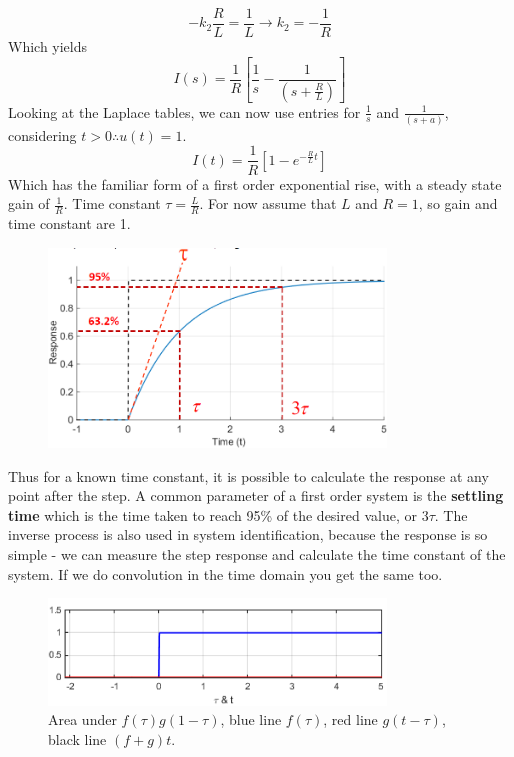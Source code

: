 \documentclass[class=report, crop=false, 12pt,a4paper, tikz, border=4mm]{standalone}
\begin{document}
\begin{equation}
  -k_2 \frac{R}{L} = \frac{1}{L} \rightarrow k_2 = -\frac{1}{R}
\end{equation}
Which yields
\begin{equation}
  I(s) = \frac{1}{R} \left[ \frac{1}{s} - \frac{1}{(s+\frac{R}{L})} \right]
\end{equation}
Looking at the Laplace tables, we can now use entries for $\frac{1}{s}$ and $\frac{1}{(s + a)}$, considering $t > 0 \therefore u(t) = 1$.
\begin{equation}
  I(t) = \frac{1}{R} \left[ 1 - e^{-\frac{R}{L}t}\right]
\end{equation}
Which has the familiar form of a first order exponential rise, with a steady state gain of $\frac{1}{R}$. Time constant $\tau = \frac{L}{R}$. For now assume that $L$ and $R = 1$, so gain and time constant are 1.
\begin{figure}[H]
  \centering
  \includegraphics[width = 0.8\textwidth]{../img/diagram31.png}
\end{figure}
Thus for a known time constant, it is possible to calculate the response at any point after the step. A common parameter of a first order system is the \textbf{settling time} which is the time taken to reach 95\% of the desired value, or $3\tau$. The inverse process is also used in system identification, because the response is so simple - we can measure the step response and calculate the time constant of the system. If we do convolution in the time domain you get the same too.
\begin{figure}[H]
  \centering
  \includegraphics[width = 0.8\textwidth]{../img/diagram32.png}
  \caption{Area under $f(\tau)g(1-\tau)$, blue line $f(\tau)$, red line $g(t-\tau)$, black line $(f+g)t$.}
\end{figure}
\end{document}
